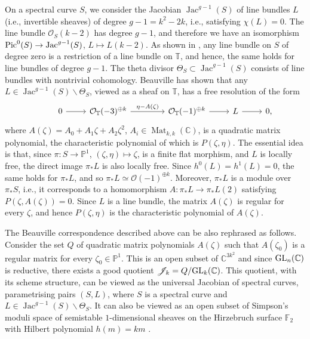 \documentclass[10pt,a4paper]{amsart}
\newcommand{\cx}{{\mathbb C}}
\newcommand{\Jac}{\operatorname{Jac}}
\newcommand{\Mat}{\operatorname{Mat}}
\numberwithin{equation}{section}
\newcommand{\oF}{{\mathbb{F}}}
\newcommand{\oP}{{\mathbb{P}}}
\newcommand{\oT}{{\mathbb{T}}}
\newcommand{\sO}{{\mathcal{O}}}
\begin{document}
On a spectral curve $S$, we consider the Jacobian $\Jac^{g-1}(S)$ of line bundles $L$ (i.e.,  invertible sheaves) of degree $g-1=k^2-2k$, i.e., satisfying $\chi(L)=0$. The line bundle $\sO_S(k-2)$ has degree $g-1$, and therefore we have an isomorphism ${\rm Pic}^0(S)\to \Jac^{g-1}(S)$, $L\mapsto L(k-2)$.
As shown in \cite[Proposition~2.1]{AHH}, any line bundle on $S$ of degree zero is a restriction of a line bundle on $\oT$, and hence, the same holds for line bundles of degree $g-1$. The theta divisor $\Theta_S\subset \Jac^{g-1}(S)$ consists of line bundles with nontrivial cohomology. Beauville \cite{Beau} has shown that any $L\in \Jac^{g-1}(S)\backslash \Theta_S$, viewed as a sheaf on $\oT$, has a free resolution of the form
\begin{equation}
\begin{tikzcd}
& 0 \ar[r] &\sO_\oT(-3)^{\oplus k}\ar[r,"\eta-A(\zeta)"] &[6mm] \sO_\oT(-1)^{\oplus k}\ar[r]& L\ar[r] & 0,
\end{tikzcd}\label{res}
\end{equation}
where $A(\zeta)=A_0+A_1\zeta+A_2\zeta^2$, $A_i\in \Mat_{k,k}(\cx)$, is a quadratic matrix polynomial, the characteristic polynomial of which is $P(\zeta,\eta)$. The essential idea is that, since $\pi\colon S\to\oP^1$, $(\zeta,\eta)\mapsto\zeta$, is a finite flat morphism, and $L$ is locally free, the direct image $\pi_\ast L$ is also locally free. Since $h^0(L)=h^1(L)=0$, the same holds for $\pi_\ast L$, and so $\pi_\ast L\simeq \sO(-1)^{\oplus k}$. Moreover, $\pi_\ast L$ is a module over $\pi_\ast S$, i.e., it corresponds to a homomorphism $A\colon \pi_\ast L\to \pi_\ast L(2)$ satisfying $P(\zeta,A(\zeta))=0$. Since $L$ is a line bundle, the matrix $A(\zeta)$ is regular for every $\zeta$, and hence $P(\zeta,\eta)$ is the characteristic polynomial of $A(\zeta)$.


\begin{Remark}
The Beauville correspondence described above can be also rephrased as follows. Consider the set $Q$ of quadratic matrix polynomials $A(\zeta)$ such that $A(\zeta_0)$ is a regular matrix for every $\zeta_0\in\oP^1$. This is an open subset of $\cx^{3k^2}$ and since ${\rm GL}_n(\cx)$ is reductive, there exists a good quotient $\mathscr{J}_k=Q/{\rm GL}_k(\cx)$. This quotient, with its scheme structure, can be viewed as the universal Jacobian of spectral curves, parametrising pairs $(S,L)$, where $S$ is a spectral curve and $L\in \Jac^{g-1}(S)\backslash \Theta_S$. It can also be viewed as an open subset of Simpson's moduli space of semistable $1$-dimensional sheaves on the Hirzebruch surface $\oF_2$ with Hilbert polynomial $h(m)=km$ \cite{Simp}. \label{moduli}
\end{Remark}
\end{document}
